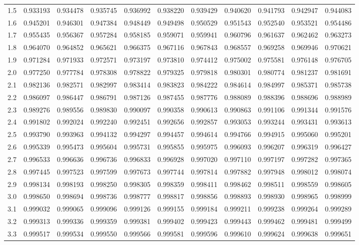 \documentclass[12pt, a6paper]{extarticle}
\begin{document}
\begin{center}
\begin{tabular}{lllllllllll}
1.5& 0.933193&0.934478&0.935745&0.936992&0.938220&0.939429&0.940620&0.941793&0.942947&0.944083 \\
1.6& 0.945201&0.946301&0.947384&0.948449&0.949498&0.950529&0.951543&0.952540&0.953521&0.954486 \\
1.7& 0.955435&0.956367&0.957284&0.958185&0.959071&0.959941&0.960796&0.961637&0.962462&0.963273 \\
1.8& 0.964070&0.964852&0.965621&0.966375&0.967116&0.967843&0.968557&0.969258&0.969946&0.970621 \\
1.9& 0.971284&0.971933&0.972571&0.973197&0.973810&0.974412&0.975002&0.975581&0.976148&0.976705 \\
2.0& 0.977250&0.977784&0.978308&0.978822&0.979325&0.979818&0.980301&0.980774&0.981237&0.981691 \\
2.1& 0.982136&0.982571&0.982997&0.983414&0.983823&0.984222&0.984614&0.984997&0.985371&0.985738 \\
2.2& 0.986097&0.986447&0.986791&0.987126&0.987455&0.987776&0.988089&0.988396&0.988696&0.988989 \\
2.3& 0.989276&0.989556&0.989830&0.990097&0.990358&0.990613&0.990863&0.991106&0.991344&0.991576 \\
2.4& 0.991802&0.992024&0.992240&0.992451&0.992656&0.992857&0.993053&0.993244&0.993431&0.993613 \\
2.5& 0.993790&0.993963&0.994132&0.994297&0.994457&0.994614&0.994766&0.994915&0.995060&0.995201 \\
2.6& 0.995339&0.995473&0.995604&0.995731&0.995855&0.995975&0.996093&0.996207&0.996319&0.996427 \\
2.7& 0.996533&0.996636&0.996736&0.996833&0.996928&0.997020&0.997110&0.997197&0.997282&0.997365 \\
2.8& 0.997445&0.997523&0.997599&0.997673&0.997744&0.997814&0.997882&0.997948&0.998012&0.998074 \\
2.9& 0.998134&0.998193&0.998250&0.998305&0.998359&0.998411&0.998462&0.998511&0.998559&0.998605 \\
3.0& 0.998650&0.998694&0.998736&0.998777&0.998817&0.998856&0.998893&0.998930&0.998965&0.998999 \\
3.1& 0.999032&0.999065&0.999096&0.999126&0.999155&0.999184&0.999211&0.999238&0.999264&0.999289 \\
3.2& 0.999313&0.999336&0.999359&0.999381&0.999402&0.999423&0.999443&0.999462&0.999481&0.999499 \\
3.3& 0.999517&0.999534&0.999550&0.999566&0.999581&0.999596&0.999610&0.999624&0.999638&0.999651 \\

\end{tabular}
\end{center}
\end{document}
